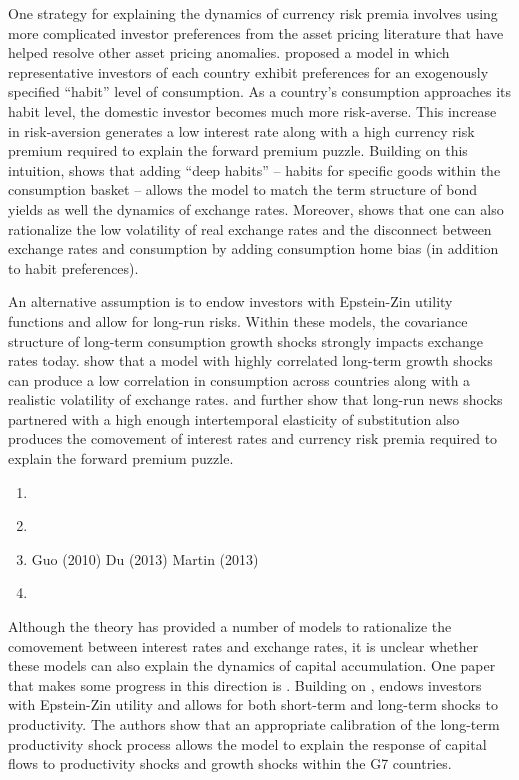 \documentclass{ar-1col}
\begin{document}
One strategy for explaining the dynamics of currency risk premia involves using more complicated investor preferences from the asset pricing literature that have helped resolve other asset pricing anomalies. \citet{Verdelhan2010} proposed a model in which representative investors of each country exhibit preferences for an exogenously specified ``habit'' level of consumption. As a country's consumption approaches its habit level, the domestic investor becomes much more risk-averse. This increase in risk-aversion generates a low interest rate along with a high currency risk premium required to explain the forward premium puzzle. Building on this intuition, \citet{Heyerdahl-Larsen2011} shows that adding ``deep habits'' -- habits for specific goods within the consumption basket -- allows the model to match the term structure of bond yields as well the dynamics of exchange rates. Moreover, \citet{Stathopoulos2017} shows that one can also rationalize the low volatility of real exchange rates and the disconnect between exchange rates and consumption by adding consumption home bias (in addition to habit preferences). 

An alternative assumption is to endow investors with Epstein-Zin utility functions and allow for long-run risks. Within these models, the covariance structure of long-term consumption growth shocks strongly impacts exchange rates today. \citet{ColacitoCroce2011} show that a model with highly correlated long-term growth shocks can produce a low correlation in consumption across countries along with a realistic volatility of exchange rates. \citet{BansalShaliastovich2012} and \citet{ColacitoCroce2013} further show that long-run news shocks partnered with a high enough intertemporal elasticity of substitution also produces the comovement of interest rates and currency risk premia required to explain the forward premium puzzle. 

\begin{enumerate}
    \item \citet{GourioSiemerVerdelhan2013}
    \item \citet{FarhiGabaix2016}
    \item Guo (2010) Du (2013) Martin (2013)
    \item \citet{Backusetal2001}
\end{enumerate}

Although the theory has provided a number of models to rationalize the comovement between interest rates and exchange rates, it is unclear whether these models can also explain the dynamics of capital accumulation. One paper that makes some progress in this direction is \citet{ColacitoCroceHoHoward2018}. Building on \citet{ColacitoCroce2011, ColacitoCroce2013}, \citet{ColacitoCroceHoHoward2018} endows investors with Epstein-Zin utility and allows for both short-term and long-term shocks to productivity. The authors show that an appropriate calibration of the long-term productivity shock process allows the model to explain
the response of capital flows to productivity shocks and growth shocks within the G7 countries.
\end{document}
